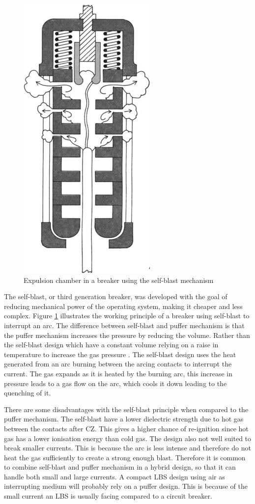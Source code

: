 \documentclass[10pt,a4paper]{article}
\begin{document}
\begin{figure} [H]
\centering
\includegraphics[scale=0.4]{Bilder/Theory/selfBlast.png}
\caption{Expulsion chamber in a breaker using the self-blast mechanism \cite{bib:CBAC}} \label{fig:selfBlast}
\end{figure}

The self-blast, or third generation breaker, was developed with the goal of reducing mechanical power of the operating system, making it cheaper and less complex. Figure \ref{fig:selfBlast} illustrates the working principle of a breaker using self-blast to interrupt an arc. The difference between self-blast and puffer mechanism is that the puffer mechanism increases the pressure by reducing the volume. Rather than the self-blast design which have a constant volume relying on a raise in temperature to increase the gas pressure \cite{bib:CBAC}. The self-blast design uses the heat generated from an arc burning between the arcing contacts to interrupt the current. The gas expands as it is heated by the burning arc, this increase in pressure leads to a gas flow on the arc, which cools it down leading to the quenching of it.

There are some disadvantages with the self-blast principle when compared to the puffer mechanism. The self-blast have a lower dielectric strength due to hot gas between the contacts after CZ. This gives a higher chance of re-ignition since hot gas has a lower ionisation energy than cold gas. The design also not well suited to break smaller currents. This is because the arc is less intense and therefore do not heat the gas sufficiently to create a strong enough blast. Therefore it is common to combine self-blast and puffer mechanism in a hybrid design, so that it can handle both small and large currents. A compact LBS design using air as interrupting medium will probably rely on a puffer design. This is because of the small current an LBS is usually facing compared to a circuit breaker.
\end{document}
